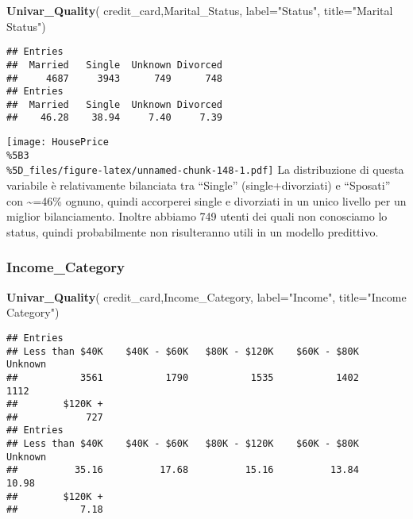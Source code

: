 \documentclass[
]{article}
\newenvironment{Shaded}{\begin{snugshade}}{\end{snugshade}}
\newcommand{\AttributeTok}[1]{\textcolor[rgb]{0.13,0.29,0.53}{#1}}
\newcommand{\FunctionTok}[1]{\textcolor[rgb]{0.13,0.29,0.53}{\textbf{#1}}}
\newcommand{\NormalTok}[1]{#1}
\newcommand{\StringTok}[1]{\textcolor[rgb]{0.31,0.60,0.02}{#1}}
\begin{document}
\begin{Shaded}
\begin{Highlighting}[]
\FunctionTok{Univar\_Quality}\NormalTok{(}
\NormalTok{  credit\_card,Marital\_Status,}
  \AttributeTok{label=}\StringTok{"Status"}\NormalTok{,}
  \AttributeTok{title=}\StringTok{"Marital Status"}\NormalTok{)}
\end{Highlighting}
\end{Shaded}

\begin{verbatim}
## Entries
##  Married   Single  Unknown Divorced 
##     4687     3943      749      748 
## Entries
##  Married   Single  Unknown Divorced 
##    46.28    38.94     7.40     7.39
\end{verbatim}

\texttt{[image: HousePrice\\\%5B3\\\%5D\_files/figure-latex/unnamed-chunk-148-1.pdf]}
La distribuzione di questa variabile è relativamente bilanciata tra
``Single'' (single+divorziati) e ``Sposati'' con \textasciitilde=46\%
ognuno, quindi accorperei single e divorziati in un unico livello per un
miglior bilanciamento. Inoltre abbiamo 749 utenti dei quali non
conosciamo lo status, quindi probabilmente non risulteranno utili in un
modello predittivo.

\subsubsection{Income\_Category}\label{income_category}

\begin{Shaded}
\begin{Highlighting}[]
\FunctionTok{Univar\_Quality}\NormalTok{(}
\NormalTok{  credit\_card,Income\_Category,}
  \AttributeTok{label=}\StringTok{"Income"}\NormalTok{,}
  \AttributeTok{title=}\StringTok{"Income Category"}\NormalTok{)}
\end{Highlighting}
\end{Shaded}

\begin{verbatim}
## Entries
## Less than $40K    $40K - $60K   $80K - $120K    $60K - $80K        Unknown 
##           3561           1790           1535           1402           1112 
##        $120K + 
##            727 
## Entries
## Less than $40K    $40K - $60K   $80K - $120K    $60K - $80K        Unknown 
##          35.16          17.68          15.16          13.84          10.98 
##        $120K + 
##           7.18
\end{verbatim}
\end{document}
